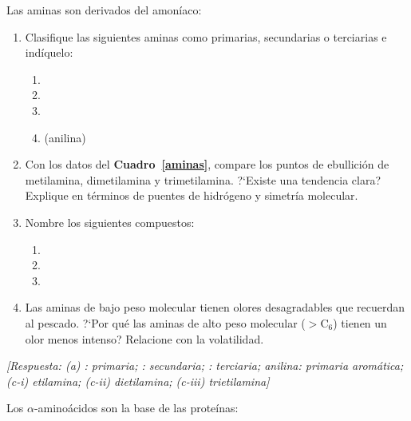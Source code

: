 \begin{bloque_ejercicios}
\begin{ejercicios}
\item Las aminas son derivados del amon\'iaco:

\begin{enumerate}[label=\alph*)]
    \item Clasifique las siguientes aminas como primarias,
          secundarias o terciarias e ind\'iquelo:
          \begin{enumerate}[label=\roman*)]
              \item {}
              \item {}
              \item {}
              \item {} (anilina)
          \end{enumerate}
    \item Con los datos del \textbf{Cuadro~\ref{aminas}}, compare
          los puntos de ebullici\'on de metilamina, dimetilamina y
          trimetilamina. ?`Existe una tendencia clara? Explique en
          t\'erminos de puentes de hidr\'ogeno y simetr\'ia
          molecular.
    \item Nombre los siguientes compuestos:
          \begin{enumerate}[label=\roman*)]
              \item {}
              \item {}
              \item {}
          \end{enumerate}
    \item Las aminas de bajo peso molecular tienen olores
          desagradables que recuerdan al pescado. ?`Por qu\'e
          las aminas de alto peso molecular ($>$C$_6$) tienen un
          olor menos intenso? Relacione con la volatilidad.
\end{enumerate}

\textit{[Respuesta: (a) : primaria;
: secundaria;
: terciaria;
anilina: primaria arom\'atica;
(c-i) etilamina; (c-ii) dietilamina; (c-iii) trietilamina]}

\item Los $\alpha$-amino\'acidos son la base de las prote\'inas:


\end{ejercicios}
\end{bloque_ejercicios}
